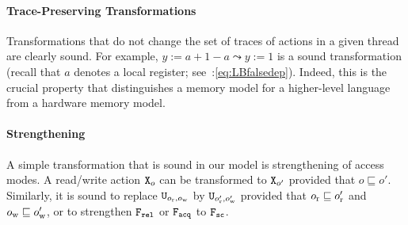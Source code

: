 \paragraph{Trace-Preserving Transformations}
Transformations that do not change the set of traces of actions in a given thread are clearly sound.
For example, $y:=a+1-a \leadsto y:=1$ is a sound transformation (recall that $a$ denotes a local register; see~:\ref{eq:LBfalsedep}).
Indeed, this is the crucial property that distinguishes a memory model for a higher-level language from
a hardware memory model.

 \paragraph{Strengthening}
A simple transformation that is sound in our model is strengthening of access modes.
A read/write action $\texttt{X}_o$ can be transformed to $\texttt{X}_{o'}$
provided that $o \sqsubseteq o'$. Similarly, 
it is sound to replace  $\texttt{U}_{o_{\text{r}},o_{\text{w}}}$ by $\texttt{U}_{o'_{\text{r}},o'_{\text{w}}}$ provided that 
$o_{\text{r}} \sqsubseteq o'_{\text{r}}$ and $o_{\text{w}} \sqsubseteq o'_{\text{w}}$,
or to strengthen $\texttt{F}_{\texttt{rel}}$ or $\texttt{F}_{\texttt{acq}}$ to $\texttt{F}_{\texttt{sc}}$.

